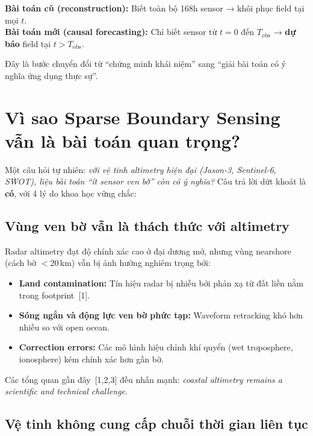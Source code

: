 \documentclass[12pt,a4paper]{article}
\begin{document}
\begin{tcolorbox}[colback=blue!5, colframe=blue!50!black, title={Tái định vị bài toán trung tâm}]
\textbf{Bài toán cũ (reconstruction):} Biết toàn bộ 168h sensor → khôi phục field tại mọi $t$.\\[4pt]
\textbf{Bài toán mới (causal forecasting):} Chỉ biết sensor từ $t=0$ đến $T_\mathrm{obs}$ → \textbf{dự báo} field tại $t > T_\mathrm{obs}$.
\end{tcolorbox}

Đây là bước chuyển đổi từ ``chứng minh khái niệm'' sang ``giải bài toán có ý nghĩa ứng dụng thực sự''.

\section{Vì sao Sparse Boundary Sensing vẫn là bài toán quan trọng?}

Một câu hỏi tự nhiên: \emph{với vệ tinh altimetry hiện đại (Jason-3, Sentinel-6, SWOT), liệu bài toán ``ít sensor ven bờ'' còn có ý nghĩa?} Câu trả lời dứt khoát là \textbf{có}, với 4 lý do khoa học vững chắc:

\subsection{Vùng ven bờ vẫn là thách thức với altimetry}

Radar altimetry đạt độ chính xác cao ở đại dương mở, nhưng vùng nearshore (cách bờ $<$20\,km) vẫn bị ảnh hưởng nghiêm trọng bởi:
\begin{itemize}[nosep]
  \item \textbf{Land contamination:} Tín hiệu radar bị nhiễu bởi phản xạ từ đất liền nằm trong footprint~[1].
  \item \textbf{Sóng ngắn và động lực ven bờ phức tạp:} Waveform retracking khó hơn nhiều so với open ocean.
  \item \textbf{Correction errors:} Các mô hình hiệu chỉnh khí quyển (wet troposphere, ionosphere) kém chính xác hơn gần bờ.
\end{itemize}

Các tổng quan gần đây~[1,2,3] đều nhấn mạnh: \emph{coastal altimetry remains a scientific and technical challenge}.

\subsection{Vệ tinh không cung cấp chuỗi thời gian liên tục}
\end{document}
